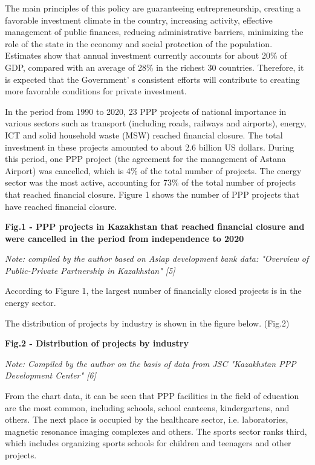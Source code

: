 The main principles of this policy are guaranteeing entrepreneurship,
creating a favorable investment climate in the country, increasing
activity, effective management of public finances, reducing
administrative barriers, minimizing the role of the state in the economy
and social protection of the population. Estimates show that annual
investment currently accounts for about 20\% of GDP, compared with an
average of 28\% in the richest 30 countries. Therefore, it is expected
that the Government' s consistent efforts will contribute
to creating more favorable conditions for private investment.

In the period from 1990 to 2020, 23 PPP projects of national importance
in various sectors such as transport (including roads, railways and
airports), energy, ICT and solid household waste (MSW) reached financial
closure. The total investment in these projects amounted to about 2.6
billion US dollars. During this period, one PPP project (the agreement
for the management of Astana Airport) was cancelled, which is 4\% of the
total number of projects. The energy sector was the most active,
accounting for 73\% of the total number of projects that reached
financial closure. Figure 1 shows the number of PPP projects that have
reached financial closure.

{\bfseries Fig.1 - PPP projects in Kazakhstan that reached financial
closure and were cancelled in the period from independence to 2020}

\emph{Note: compiled by the author based on Asiap development bank data:
"Overview of Public-Private Partnership in Kazakhstan" {[}5{]}}

According to Figure 1, the largest number of financially closed projects
is in the energy sector.

The distribution of projects by industry is shown in the figure below.
(Fig.2)

{\bfseries Fig.2 - Distribution of projects by industry}

\emph{Note: Compiled by the author on the basis of data from JSC
"Kazakhstan PPP Development Center" {[}6{]}}

From the chart data, it can be seen that PPP facilities in the field of
education are the most common, including schools, school canteens,
kindergartens, and others. The next place is occupied by the healthcare
sector, i.e. laboratories, magnetic resonance imaging complexes and
others. The sports sector ranks third, which includes organizing sports
schools for children and teenagers and other projects.

